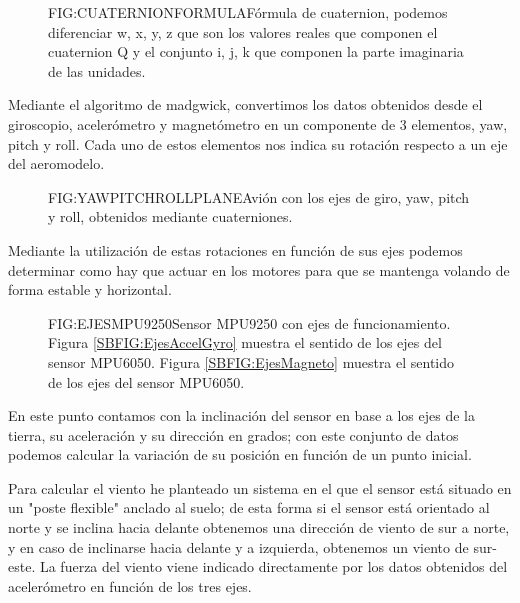 \begin{figure}{FIG:CUATERNIONFORMULA}{Fórmula de cuaternion, podemos diferenciar w, x, y, z que son los valores reales que componen el cuaternion Q y el conjunto i, j, k que componen la parte imaginaria de las unidades. }
\end{figure}

   Mediante el algoritmo de madgwick, convertimos los datos obtenidos desde el giroscopio, acelerómetro y magnetómetro en un componente de 3 elementos, yaw, pitch y roll.
   Cada uno de estos elementos nos indica su rotación respecto a un eje del aeromodelo. 
 

\begin{figure}{FIG:YAWPITCHROLLPLANE}{Avión con los ejes de giro, yaw, pitch y roll, obtenidos mediante cuaterniones.}
\end{figure}
 
 Mediante la utilización de estas rotaciones en función de sus ejes podemos determinar como hay que actuar en los motores para que se mantenga volando de forma estable y horizontal.
  

\begin{figure}[Ejes MPU9250]{FIG:EJESMPU9250}{Sensor MPU9250 con ejes de funcionamiento. Figura \ref{SBFIG:EjesAccelGyro} muestra el sentido de los ejes del sensor MPU6050. Figura \ref{SBFIG:EjesMagneto} muestra el sentido de los ejes del sensor MPU6050.}
   \quad
\end{figure} 

 
 En este punto contamos con la inclinación del sensor en base a los ejes de la tierra, su aceleración y su dirección en grados; con este conjunto de datos podemos calcular la variación de su posición en función de un punto inicial.
   
  Para calcular el viento he planteado un sistema en el que el sensor está situado en un "poste flexible" anclado al suelo; de esta forma si el sensor está orientado al norte y se inclina hacia delante obtenemos una dirección de viento de sur a norte, y en caso de inclinarse hacia delante y a izquierda, obtenemos un viento de sur-este. La fuerza del viento viene indicado directamente por los datos obtenidos del acelerómetro en función de los tres ejes.
  
  